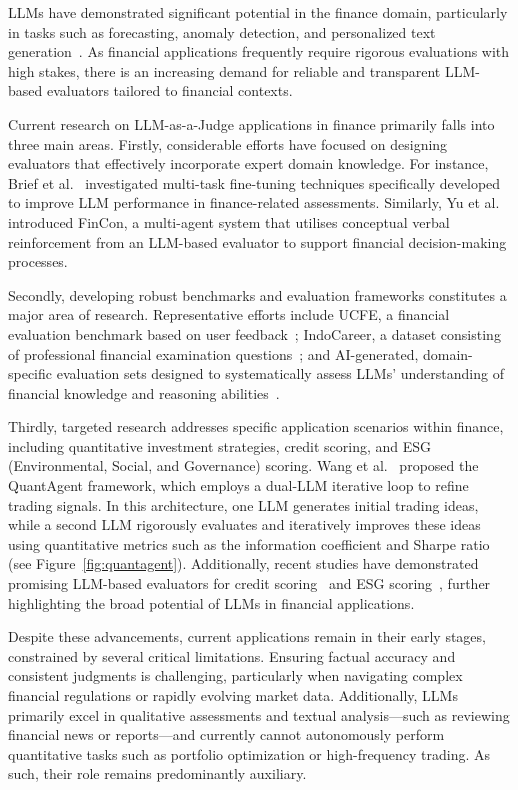 LLMs have demonstrated significant potential in the finance domain, particularly in tasks such as forecasting, anomaly detection, and personalized text generation~\cite{zhao2024revolutionizing}. As financial applications frequently require rigorous evaluations with high stakes, there is an increasing demand for reliable and transparent LLM-based evaluators tailored to financial contexts.

Current research on LLM-as-a-Judge applications in finance primarily falls into three main areas. Firstly, considerable efforts have focused on designing evaluators that effectively incorporate expert domain knowledge. For instance, Brief et al.~\cite{brief2024mixing} investigated multi-task fine-tuning techniques specifically developed to improve LLM performance in finance-related assessments. Similarly, Yu et al.~\cite{yu2024fincon} introduced FinCon, a multi-agent system that utilises conceptual verbal reinforcement from an LLM-based evaluator to support financial decision-making processes.

Secondly, developing robust benchmarks and evaluation frameworks constitutes a major area of research. Representative efforts include UCFE, a financial evaluation benchmark based on user feedback~\cite{yang2024ucfe}; IndoCareer, a dataset consisting of professional financial examination questions~\cite{koto2024cracking}; and AI-generated, domain-specific evaluation sets designed to systematically assess LLMs’ understanding of financial knowledge and reasoning abilities~\cite{raju2024constructing}.

Thirdly, targeted research addresses specific application scenarios within finance, including quantitative investment strategies, credit scoring, and ESG (Environmental, Social, and Governance) scoring. Wang et al.~\cite{wang_quantagent_2024} proposed the QuantAgent framework, which employs a dual-LLM iterative loop to refine trading signals. In this architecture, one LLM generates initial trading ideas, while a second LLM rigorously evaluates and iteratively improves these ideas using quantitative metrics such as the information coefficient and Sharpe ratio (see Figure~\ref{fig:quantagent}). 
Additionally, recent studies have demonstrated promising LLM-based evaluators for credit scoring~\cite{yoon2023design,babaei2024gpt} and ESG scoring~\cite{zhao2024revolutionizing}, further highlighting the broad potential of LLMs in financial applications.

Despite these advancements, current applications remain in their early stages, constrained by several critical limitations. Ensuring factual accuracy and consistent judgments is challenging, particularly when navigating complex financial regulations or rapidly evolving market data. Additionally, LLMs primarily excel in qualitative assessments and textual analysis—such as reviewing financial news or reports—and currently cannot autonomously perform quantitative tasks such as portfolio optimization or high-frequency trading. As such, their role remains predominantly auxiliary.

